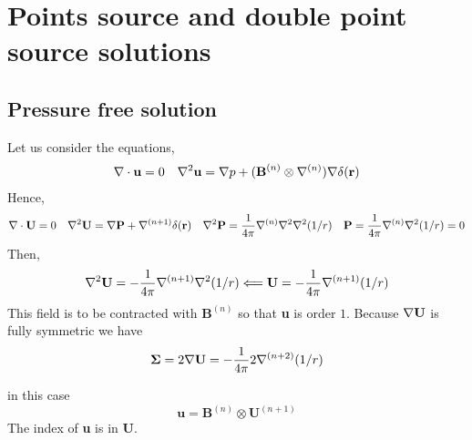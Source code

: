 




\section{Points source and double point source solutions}
\subsection{Pressure free solution}
Let us consider the equations, 
\begin{align}
    \mathbf{\nabla}\cdot\textbf{u}= 0 
    &&
    \mathbf{\nabla}^2\textbf{u}=\mathbf{\nabla} p+ (\textbf{B}^{(n)}\otimes \mathbf{\nabla}^{(n)})\mathbf{\nabla}\delta(\textbf{r})
\end{align}
Hence, 
\begin{align}
    \mathbf{\nabla}\cdot\textbf{U}= 0 
    &&
    \mathbf{\nabla}^2\textbf{U}=\mathbf{\nabla} \textbf{P}+ \mathbf{\nabla}^{(n+1)} \delta(\textbf{r})
    &&
    \mathbf{\nabla}^2 \textbf{P} = \frac{1}{4\pi}\mathbf{\nabla}^{(n)}\mathbf{\nabla}^2 \mathbf{\nabla}^2(1/r) 
    &&
    \textbf{P} = \frac{1}{4\pi}\mathbf{\nabla}^{(n)}\mathbf{\nabla}^2(1/r) = 0 
\end{align}
Then, 
\begin{equation}
    \mathbf{\nabla}^2\textbf{U}= -\frac{1}{4\pi } \mathbf{\nabla}^{(n+1)} \mathbf{\nabla}^2 (1/r)
    \Longleftarrow
    \textbf{U}= - \frac{1}{4\pi }\mathbf{\nabla}^{(n+1)}(1/r)
\end{equation}
This field is to be contracted with $\textbf{B}^{(n)}$ so that \textbf{u} is order $1$. 
Because $\mathbf{\nabla}\textbf{U}$ is fully symmetric we have 
\begin{equation}
    \bm\Sigma = 2\mathbf{\nabla} \textbf{U}=- \frac{1}{4\pi }2 \mathbf{\nabla}^{(n+2)}(1/r)
\end{equation}

in this case 
\begin{equation}
    \textbf{u}= \textbf{B}^{(n)}\otimes \textbf{U}^{(n+1)}
\end{equation}
The index of \textbf{u} is in \textbf{U}. 
